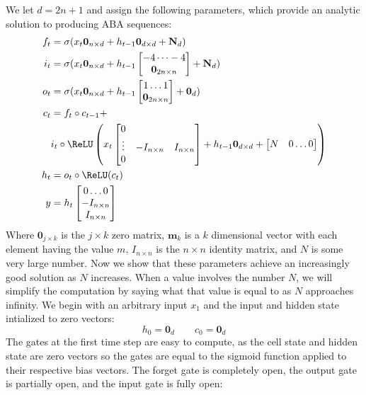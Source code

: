 We let $d = 2n + 1$ and assign the following parameters, which provide an analytic solution to producing ABA sequences:
%
\begin{align*}
  f_t &= \sigma(x_t \textbf{0}_{n\times d} + h_{t-1}\textbf{0}_{d \times d} + \textbf{N}_{d}) \\
  i_t &= \sigma(x_t\textbf{0}_{n\times d} + h_{t-1}\begin{bmatrix} -4 \dots -4 \\ \textbf{0}_{2n\times n} \end{bmatrix}  + \textbf{N}_d)   \\
  o_t &= \sigma(x_t\textbf{0}_{n\times d} +  h_{t-1} \begin{bmatrix} 1 \dots 1 \\ \textbf{0}_{2n\times n} \end{bmatrix} + \textbf{0}_{d})\\
  c_t &= f_t \circ c_{t-1} + \\
  & i_t \circ \ReLU\left(x_t \begin{bmatrix} 0 &  & \\ \vdots & -I_{n \times n} & I_{n \times n}\\ 0 & &  \end{bmatrix} + h_{t-1}\textbf{0}_{d \times d} + \begin{bmatrix} N & 0 \dots 0\end{bmatrix}\right) \\
  h_t &= o_t \circ \ReLU(c_t)\\
  y &= h_t \begin{bmatrix} 0 \dots 0 \\ -I_{n \times n} \\ I_{n \times n}  \end{bmatrix}
\end{align*}
%
Where $\textbf{0}_{j\times k}$ is the $j \times k$ zero matrix, $\textbf{m}_k$ is a $k$ dimensional vector with each element having the value $m$, $I_{n\times n}$ is the $n \times n$ identity matrix, and $N$ is some very large number.  Now we show that these parameters achieve an increasingly good solution as $N$ increases. When a value involves the number $N$, we will simplify the computation by saying what that value is equal to as $N$ approaches infinity. We begin with an arbitrary input $x_1$ and the input and hidden state intialized to zero vectors:
%
\[
  h_0 = \textbf{0}_d \qquad c_0 = \textbf{0}_d
\]
%
The gates at the first time step are easy to compute, as the cell state and hidden state are zero vectors so the gates are equal to the sigmoid function applied to their respective bias vectors. The forget gate is completely open, the output gate is partially open, and the input gate is fully open:
